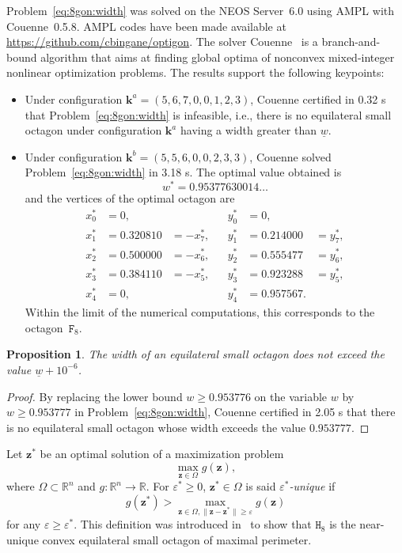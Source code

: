 \documentclass[a4paper,12pt]{article}
\theoremstyle{definition}
\theoremstyle{plain}
\newtheorem{proposition}{Proposition}
\newcommand{\R}{\mathbb{R}}
\newcommand{\rv}[1]{\boldsymbol{#1}}
\newcommand{\lb}[1]{\underline{#1}}
\newcommand{\geo}[1]{\mathtt{#1}}
\begin{document}
Problem~\eqref{eq:8gon:width} was solved on the NEOS Server~6.0 using AMPL with Couenne~0.5.8. AMPL codes have been made available at \url{https://github.com/cbingane/optigon}. The solver Couenne~\cite{belotti2009} is a branch-and-bound algorithm that aims at finding global optima of nonconvex mixed-integer nonlinear optimization problems. The results support the following keypoints:
\begin{itemize}
	\item Under configuration $\rv{k}^a = (5,6,7,0,0,1,2,3)$, Couenne certified in 0.32 s that Problem~\eqref{eq:8gon:width} is infeasible, i.e., there is no equilateral small octagon under configuration $\rv{k}^a$ having a width greater than $\lb{w}$.
	\item Under configuration $\rv{k}^b = (5,5,6,0,0,2,3,3)$, Couenne solved Problem~\eqref{eq:8gon:width} in 3.18 s. The optimal value obtained is
	\[
	w^* = 0.95377630014\ldots
	\]
	and the vertices of the optimal octagon are
	\[
	\begin{aligned}
		x_0^* &= 0,&&&y_0^* &= 0,\\
		x_1^* &= 0.320810 &= -x_7^*, &&y_1^* &= 0.214000 &= y_7^*,\\
		x_2^* &= 0.500000 &= -x_6^*, &&y_2^* &= 0.555477 &= y_6^*,\\
		x_3^* &= 0.384110 &= -x_5^*, &&y_3^* &= 0.923288 &= y_5^*,\\
		x_4^* &= 0, &&&y_4^* &= 0.957567.
	\end{aligned}
	\]
	Within the limit of the numerical computations, this corresponds to the octagon~$\geo{F}_8$.
\end{itemize}

\begin{proposition}
	The width of an equilateral small octagon does not exceed the value $\lb{w} + 10^{-6}$.
\end{proposition}
\begin{proof}
	By replacing the lower bound $w\ge 0.953776$ on the variable $w$ by $w\ge 0.953777$ in Problem~\eqref{eq:8gon:width}, Couenne certified in 2.05 s that there is no equilateral small octagon whose width exceeds the value $0.953777$.
\end{proof}

Let $\rv{z}^*$ be an optimal solution of a maximization problem
\[
\max_{\rv{z} \in \Omega} g(\rv{z}),
\]
where $\Omega \subset \R^n$ and $g\colon \R^n \to \R$. For $\varepsilon^* \ge 0$, $\rv{z}^* \in \Omega$ is said {\em $\varepsilon^*$-unique} if
\[
g(\rv{z}^*) > \max_{\rv{z} \in \Omega, \|\rv{z} - \rv{z}^*\| \ge \varepsilon} g(\rv{z})
\]
for any $\varepsilon \ge \varepsilon^*$. This definition was introduced in~\cite{audet2004} to show that $\geo{H}_8$ is the near-unique convex equilateral small octagon of maximal perimeter.
\end{document}
